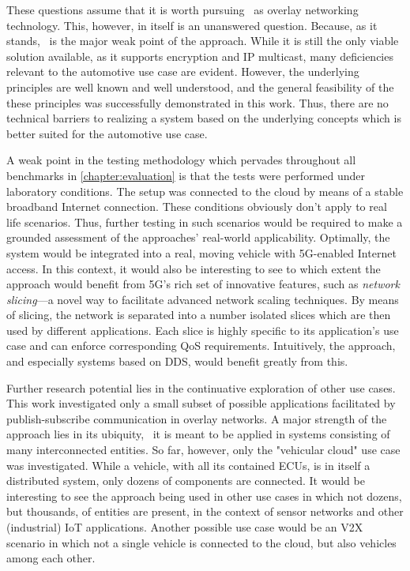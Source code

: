 These questions assume that it is worth pursuing \wnet\ as overlay networking technology. This, however, in itself is an unanswered question. Because, as it stands, \wnet\ is the major weak point of the approach. While it is still the only viable solution available, as it supports encryption and IP multicast, many deficiencies relevant to the automotive use case are evident. However, the underlying principles are well known and well understood, and the general feasibility of the these principles was successfully demonstrated in this work. Thus, there are no technical barriers to realizing a system based on the underlying concepts which is better suited for the automotive use case. 

 A weak point in the testing methodology which pervades throughout all benchmarks in \autoref{chapter:evaluation} is that the tests were performed under laboratory conditions. The setup was connected to the cloud by means of a stable broadband Internet connection. These conditions obviously don't apply to real life scenarios. Thus, further testing in such scenarios would be required to make a grounded assessment of the approaches' real-world applicability. Optimally, the system would be integrated into a real, moving vehicle with 5G-enabled Internet access. In this context, it would also be interesting to see to which extent the approach would benefit from 5G's rich set of innovative features, such as \emph{network slicing}---a novel way to facilitate advanced network scaling techniques. By means of slicing, the network is separated into a number isolated slices which are then used by different applications. Each slice is highly specific to its application's use case and can enforce corresponding QoS requirements. Intuitively, the approach, and especially systems based on DDS, would benefit greatly from this.

Further research potential lies in the continuative exploration of other use cases. This work investigated only a small subset of possible applications facilitated by publish-subscribe communication in overlay networks. A major strength of the approach lies in its ubiquity, \ie\ it is meant to be applied in systems consisting of many interconnected entities. So far, however, only the "vehicular cloud" use case was investigated. While a vehicle, with all its contained ECUs, is in itself a distributed system, only dozens of components are connected. It would be interesting to see the approach being used in other use cases in which not dozens, but thousands, of entities are present, \eg in the context of sensor networks and other (industrial) IoT applications. Another possible use case would be an V2X scenario in which not a single vehicle is connected to the cloud, but also vehicles among each other.

